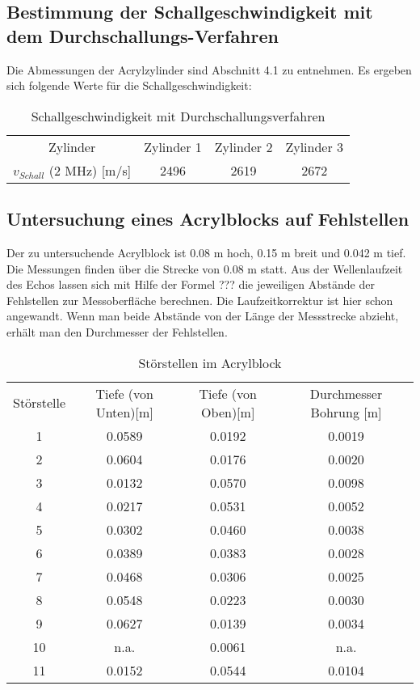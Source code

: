 \documentclass[11pt,ngerman,a4paper]{article}
\begin{document}
\subsection{Bestimmung der Schallgeschwindigkeit mit dem Durchschallungs-Verfahren}

Die Abmessungen der Acrylzylinder sind Abschnitt 4.1 zu entnehmen. Es ergeben sich folgende Werte für die Schallgeschwindigkeit:
\begin{table}[h]
\centering
 \begin{tabular}{|c||c|c|c|}
 Zylinder & Zylinder 1 & Zylinder 2 & Zylinder 3 \\
 $v_{Schall}$ (2 MHz) [m/s] & 2496 & 2619 & 2672 \\
 \end{tabular}
\caption{Schallgeschwindigkeit mit Durchschallungsverfahren}
\end{table}
\subsection{Untersuchung eines Acrylblocks auf Fehlstellen}
Der zu untersuchende Acrylblock ist 0.08 m hoch, 0.15 m breit und 0.042 m tief. Die Messungen finden über die Strecke von 0.08 m statt. Aus der Wellenlaufzeit des Echos lassen sich mit Hilfe der Formel ??? die jeweiligen Abstände der Fehlstellen zur Messoberfläche berechnen. Die Laufzeitkorrektur ist hier schon angewandt. Wenn man beide Abstände von der Länge der Messstrecke abzieht, erhält man den Durchmesser der Fehlstellen. 
\begin{table}[h]
\centering
 \begin{tabular}{|c||c|c|c|}
Störstelle  & Tiefe (von Unten)[m] & Tiefe (von Oben)[m]& Durchmesser Bohrung [m] \\
1 & 0.0589 & 0.0192 & 0.0019 \\
2 & 0.0604 & 0.0176 & 0.0020 \\
3 & 0.0132 & 0.0570 & 0.0098 \\
4 & 0.0217 & 0.0531 & 0.0052 \\
5 & 0.0302 & 0.0460 & 0.0038 \\
6 & 0.0389 & 0.0383 & 0.0028 \\
7 & 0.0468 & 0.0306 & 0.0025 \\
8 & 0.0548 & 0.0223 & 0.0030 \\
9 & 0.0627 & 0.0139 & 0.0034 \\
10 & n.a. & 0.0061 & n.a. \\
11 & 0.0152 & 0.0544 & 0.0104 \\
 \end{tabular}
\caption{Störstellen im Acrylblock}
\end{table}
\end{document}
